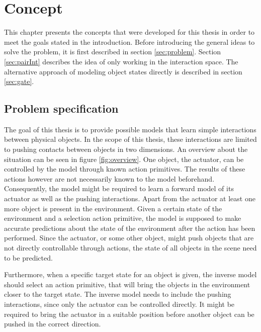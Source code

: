 \chapter{Concept \label{chap:concept}}


This chapter presents the concepts that were developed for this thesis in order
to meet the goals stated in the introduction. Before introducing the general ideas 
to solve the problem, it is first described in section \ref{sec:problem}. Section 
\ref{sec:pairInt} describes 
the idea of only working in the interaction space. The alternative approach of 
modeling object states directly is described in section \ref{sec:gate}.

\section{Problem specification \label{sec:problem}}

The goal of this thesis is to provide possible models that learn simple interactions between physical objects. In the scope of this thesis, these interactions are limited to pushing contacts between objects in two dimensions. An overview about the situation can be seen in figure \ref{fig:overview}. %
One object, the actuator, can be controlled by the model through known action primitives. The results of these actions however are not necessarily known to the model beforehand. Consequently, the model might be required to learn a forward model of its actuator as well as the pushing interactions. Apart from the actuator at least one more object is present in the environment. Given a certain state of the environment and a selection action primitive, the model is supposed to make accurate predictions about the state of the environment after the action has been performed. Since the actuator, or some other object, might push objects that are not directly controllable through actions, the state of all objects in the scene need to be predicted. 

Furthermore, when a specific target state for an object is given, the inverse model should select an action primitive, that will bring the objects in the environment closer to the target state. The inverse model needs to include the pushing interactions, since only the actuator can be controlled directly. It might be required to bring the actuator in a suitable position before another object can be pushed in the correct direction. %

